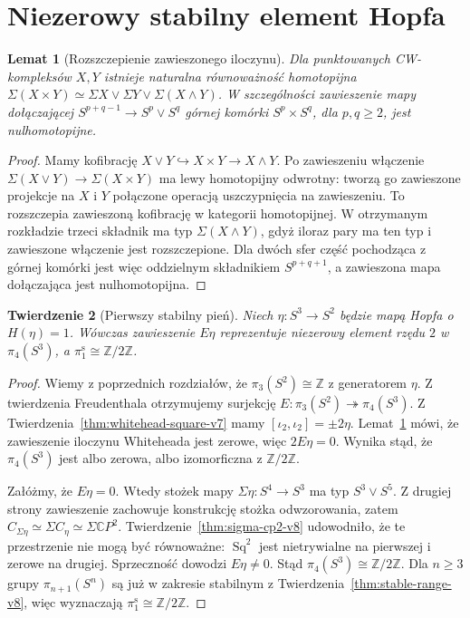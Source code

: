 \documentclass[11pt,a4paper,oneside]{report}
\newcommand{\C}{\mathbb{C}}
\newcommand{\Z}{\mathbb{Z}}
\theoremstyle{plain}
\newtheorem{twierdzenie}{Twierdzenie}[section]
\newtheorem{lemat}[twierdzenie]{Lemat}
\theoremstyle{definition}
\theoremstyle{remark}
\begin{document}
\section{Niezerowy stabilny element Hopfa}
\begin{lemat}[Rozszczepienie zawieszonego iloczynu]
\label{lem:sigma-product-v8}
Dla punktowanych CW-kompleksów $X,Y$ istnieje naturalna
równoważność homotopijna
$\Sigma(X\times Y)\simeq
\Sigma X\vee\Sigma Y\vee\Sigma(X\wedge Y)$.
W szczególności zawieszenie mapy dołączającej
$S^{p+q-1}\to S^p\vee S^q$ górnej komórki
$S^p\times S^q$, dla $p,q\ge2$, jest nulhomotopijne.
\end{lemat}
\begin{proof}
Mamy kofibrację $X\vee Y\hookrightarrow X\times Y
\to X\wedge Y$.
Po zawieszeniu włączenie
$\Sigma(X\vee Y)\to\Sigma(X\times Y)$
ma lewy homotopijny odwrotny: tworzą go zawieszone
projekcje na $X$ i $Y$ połączone operacją uszczypnięcia
na zawieszeniu. To rozszczepia zawieszoną kofibrację
w kategorii homotopijnej. W otrzymanym rozkładzie
trzeci składnik ma typ $\Sigma(X\wedge Y)$,
gdyż iloraz pary ma ten typ i zawieszone włączenie
jest rozszczepione. Dla dwóch sfer część pochodząca
z górnej komórki jest więc oddzielnym składnikiem
$S^{p+q+1}$, a zawieszona mapa dołączająca jest
nulhomotopijna.
\end{proof}

\begin{twierdzenie}[Pierwszy stabilny pień]
\label{thm:stable-eta-v8}
Niech $\eta:S^3\to S^2$ będzie mapą Hopfa o
$H(\eta)=1$. Wówczas zawieszenie $E\eta$
reprezentuje niezerowy element rzędu $2$ w
$\pi_4(S^3)$, a
$\pi_1^{\mathrm s}\cong\Z/2\Z$.
\end{twierdzenie}
\begin{proof}
Wiemy z poprzednich rozdziałów, że
$\pi_3(S^2)\cong\Z$ z generatorem $\eta$.
Z twierdzenia Freudenthala otrzymujemy surjekcję
$E:\pi_3(S^2)\twoheadrightarrow\pi_4(S^3)$.
Z Twierdzenia~\ref{thm:whitehead-square-v7} mamy
$[\iota_2,\iota_2]=\pm2\eta$.
Lemat~\ref{lem:sigma-product-v8} mówi, że zawieszenie
iloczynu Whiteheada jest zerowe, więc $2E\eta=0$.
Wynika stąd, że $\pi_4(S^3)$ jest albo zerowa,
albo izomorficzna z $\Z/2\Z$.

Załóżmy, że $E\eta=0$. Wtedy stożek mapy
$\Sigma\eta:S^4\to S^3$ ma typ
$S^3\vee S^5$. Z drugiej strony zawieszenie zachowuje
konstrukcję stożka odwzorowania, zatem
$C_{\Sigma\eta}\simeq\Sigma C_\eta
\simeq\Sigma\C P^2$.
Twierdzenie~\ref{thm:sigma-cp2-v8} udowodniło,
że te przestrzenie nie mogą być równoważne:
$\operatorname{Sq}^2$ jest nietrywialne na pierwszej
i zerowe na drugiej. Sprzeczność dowodzi $E\eta\ne0$.
Stąd $\pi_4(S^3)\cong\Z/2\Z$.
Dla $n\ge3$ grupy $\pi_{n+1}(S^n)$ są już w zakresie
stabilnym z Twierdzenia~\ref{thm:stable-range-v8},
więc wyznaczają $\pi_1^{\mathrm s}\cong\Z/2\Z$.
\end{proof}
\end{document}
